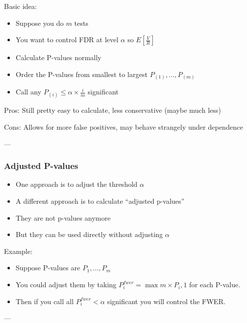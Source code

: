 \documentclass[10pt,article]{article}
\begin{document}
Basic idea:
\begin{itemize}
\item Suppose you do \(m\) tests
\item You want to control FDR at level \(\alpha\) so \(E\left[\frac{V}{R}\right]\)
\item Calculate P-values normally
\item Order the P-values from smallest to largest \(P_{(1)},...,P_{(m)}\)
\item Call any \(P_{(i)} \leq \alpha \times \frac{i}{m}\) significant
\end{itemize}

Pros: Still pretty easy to calculate, less conservative (maybe much less)

Cons: Allows for more false positives, may behave strangely under dependence

---

\subsubsection{Adjusted P-values}
\label{sec:orgefbcc83}

\begin{itemize}
\item One approach is to adjust the threshold \(\alpha\)
\item A different approach is to calculate ``adjusted p-values''
\item They are not p-values anymore
\item But they can be used directly without adjusting \(\alpha\)
\end{itemize}

Example:
\begin{itemize}
\item Suppose P-values are \(P_1,\ldots,P_m\)
\item You could adjust them by taking \(P_i^{fwer} = \max{m \times P_i,1}\) for each P-value.
\item Then if you call all \(P_i^{fwer} < \alpha\) significant you will control the FWER.
\end{itemize}

---
\end{document}
